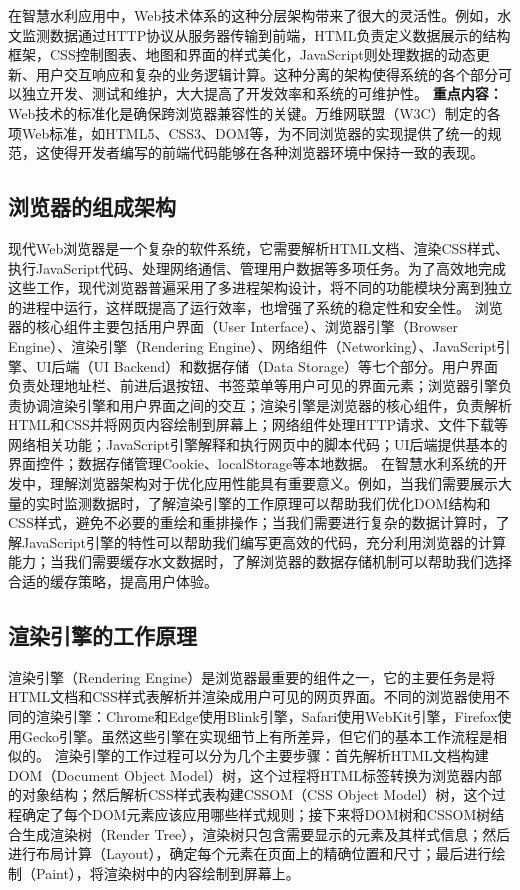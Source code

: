 在智慧水利应用中，Web技术体系的这种分层架构带来了很大的灵活性。例如，水文监测数据通过HTTP协议从服务器传输到前端，HTML负责定义数据展示的结构框架，CSS控制图表、地图和界面的样式美化，JavaScript则处理数据的动态更新、用户交互响应和复杂的业务逻辑计算。这种分离的架构使得系统的各个部分可以独立开发、测试和维护，大大提高了开发效率和系统的可维护性。 \textbf{重点内容：} Web技术的标准化是确保跨浏览器兼容性的关键。万维网联盟（W3C）制定的各项Web标准，如HTML5、CSS3、DOM等，为不同浏览器的实现提供了统一的规范，这使得开发者编写的前端代码能够在各种浏览器环境中保持一致的表现。 \subsection{浏览器的组成架构}\label{ux6d4fux89c8ux5668ux7684ux7ec4ux6210ux67b6ux6784} 现代Web浏览器是一个复杂的软件系统，它需要解析HTML文档、渲染CSS样式、执行JavaScript代码、处理网络通信、管理用户数据等多项任务。为了高效地完成这些工作，现代浏览器普遍采用了多进程架构设计，将不同的功能模块分离到独立的进程中运行，这样既提高了运行效率，也增强了系统的稳定性和安全性。 浏览器的核心组件主要包括用户界面（User Interface）、浏览器引擎（Browser Engine）、渲染引擎（Rendering Engine）、网络组件（Networking）、JavaScript引擎、UI后端（UI Backend）和数据存储（Data Storage）等七个部分。用户界面负责处理地址栏、前进后退按钮、书签菜单等用户可见的界面元素；浏览器引擎负责协调渲染引擎和用户界面之间的交互；渲染引擎是浏览器的核心组件，负责解析HTML和CSS并将网页内容绘制到屏幕上；网络组件处理HTTP请求、文件下载等网络相关功能；JavaScript引擎解释和执行网页中的脚本代码；UI后端提供基本的界面控件；数据存储管理Cookie、localStorage等本地数据。 在智慧水利系统的开发中，理解浏览器架构对于优化应用性能具有重要意义。例如，当我们需要展示大量的实时监测数据时，了解渲染引擎的工作原理可以帮助我们优化DOM结构和CSS样式，避免不必要的重绘和重排操作；当我们需要进行复杂的数据计算时，了解JavaScript引擎的特性可以帮助我们编写更高效的代码，充分利用浏览器的计算能力；当我们需要缓存水文数据时，了解浏览器的数据存储机制可以帮助我们选择合适的缓存策略，提高用户体验。 \subsection{渲染引擎的工作原理}\label{ux6e32ux67d3ux5f15ux64ceux7684ux5de5ux4f5cux539fux7406} 渲染引擎（Rendering Engine）是浏览器最重要的组件之一，它的主要任务是将HTML文档和CSS样式表解析并渲染成用户可见的网页界面。不同的浏览器使用不同的渲染引擎：Chrome和Edge使用Blink引擎，Safari使用WebKit引擎，Firefox使用Gecko引擎。虽然这些引擎在实现细节上有所差异，但它们的基本工作流程是相似的。 渲染引擎的工作过程可以分为几个主要步骤：首先解析HTML文档构建DOM（Document Object Model）树，这个过程将HTML标签转换为浏览器内部的对象结构；然后解析CSS样式表构建CSSOM（CSS Object Model）树，这个过程确定了每个DOM元素应该应用哪些样式规则；接下来将DOM树和CSSOM树结合生成渲染树（Render Tree），渲染树只包含需要显示的元素及其样式信息；然后进行布局计算（Layout），确定每个元素在页面上的精确位置和尺寸；最后进行绘制（Paint），将渲染树中的内容绘制到屏幕上。 